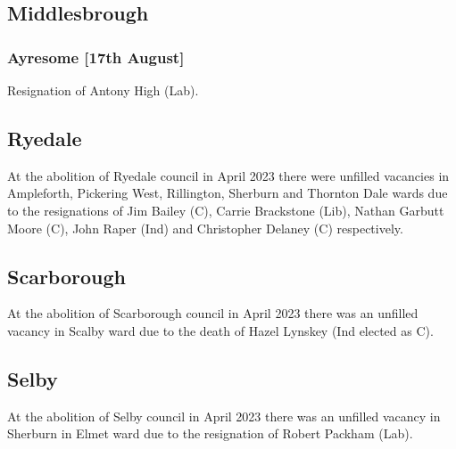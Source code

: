 \documentclass[a4paper,openany]{book}
\begin{document}
\begin{resultsiii}
\subsection*{Middlesbrough}

\subsubsection*{Ayresome \hspace*{\fill}\nolinebreak[1]%
	\enspace\hspace*{\fill}
	[17th August]}


Resignation of Antony High (Lab).

\subsection*{Ryedale}

At the abolition of Ryedale council in April 2023 there were unfilled vacancies in Ampleforth, Pickering West, Rillington, Sherburn and Thornton Dale wards due to the resignations of Jim Bailey (C), Carrie Brackstone (Lib), Nathan Garbutt Moore (C), John Raper (Ind) and Christopher Delaney (C) respectively.%
%
%
%
%

\subsection*{Scarborough}

At the abolition of Scarborough council in April 2023 there was an unfilled vacancy in Scalby ward due to the death of Hazel Lynskey (Ind elected as C).%

\subsection*{Selby}

At the abolition of Selby council in April 2023 there was an unfilled vacancy in Sherburn in Elmet ward due to the resignation of Robert Packham (Lab).%


\end{resultsiii}
\end{document}
